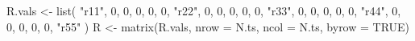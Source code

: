 \begin{Schunk}
\begin{Sinput}
 R.vals <- list(
   "r11", 0, 0, 0, 0,
   0, "r22", 0, 0, 0,
   0, 0, "r33", 0, 0,
   0, 0, 0, "r44", 0,
   0, 0, 0, 0, "r55"
 )
 R <- matrix(R.vals, nrow = N.ts, ncol = N.ts, byrow = TRUE)
\end{Sinput}
\end{Schunk}
